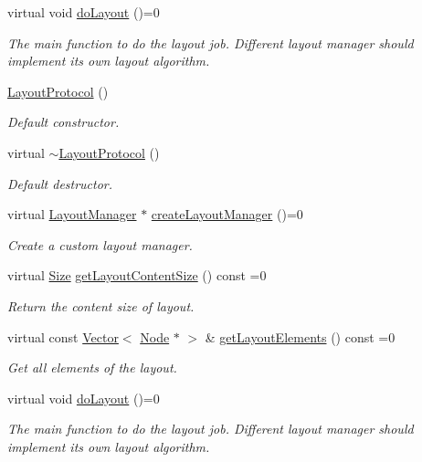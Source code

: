 \begin{DoxyCompactItemize}
virtual void \hyperlink{classui_1_1LayoutProtocol_ae6b08f2d2ce43c7b55200fb100a5a6d1}{do\+Layout} ()=0
\begin{DoxyCompactList}\small\item\em The main function to do the layout job. Different layout manager should implement its own layout algorithm. \end{DoxyCompactList}\item 
\mbox{\label{classui_1_1LayoutProtocol_a69e970e2118a39198d4b4e7a268789ca}} 
\hyperlink{classui_1_1LayoutProtocol_a69e970e2118a39198d4b4e7a268789ca}{Layout\+Protocol} ()
\begin{DoxyCompactList}\small\item\em Default constructor. \end{DoxyCompactList}\item 
\mbox{\label{classui_1_1LayoutProtocol_afed555eae002aaf1b751b5e4ee945f68}} 
virtual \hyperlink{classui_1_1LayoutProtocol_afed555eae002aaf1b751b5e4ee945f68}{$\sim$\+Layout\+Protocol} ()
\begin{DoxyCompactList}\small\item\em Default destructor. \end{DoxyCompactList}\item 
virtual \hyperlink{classui_1_1LayoutManager}{Layout\+Manager} $\ast$ \hyperlink{classui_1_1LayoutProtocol_a4ff58063d53e9e9b9684a1e2e6cc485a}{create\+Layout\+Manager} ()=0
\begin{DoxyCompactList}\small\item\em Create a custom layout manager. \end{DoxyCompactList}\item 
virtual \hyperlink{classSize}{Size} \hyperlink{classui_1_1LayoutProtocol_afacf70c8ceec076a9c1237427cbd614a}{get\+Layout\+Content\+Size} () const =0
\begin{DoxyCompactList}\small\item\em Return the content size of layout. \end{DoxyCompactList}\item 
virtual const \hyperlink{classVector}{Vector}$<$ \hyperlink{classNode}{Node} $\ast$ $>$ \& \hyperlink{classui_1_1LayoutProtocol_acd689e1718c903c7e9ed3277eb83b97c}{get\+Layout\+Elements} () const =0
\begin{DoxyCompactList}\small\item\em Get all elements of the layout. \end{DoxyCompactList}\item 
\mbox{\label{classui_1_1LayoutProtocol_ae6b08f2d2ce43c7b55200fb100a5a6d1}} 
virtual void \hyperlink{classui_1_1LayoutProtocol_ae6b08f2d2ce43c7b55200fb100a5a6d1}{do\+Layout} ()=0
\begin{DoxyCompactList}\small\item\em The main function to do the layout job. Different layout manager should implement its own layout algorithm. \end{DoxyCompactList}\end{DoxyCompactItemize}


